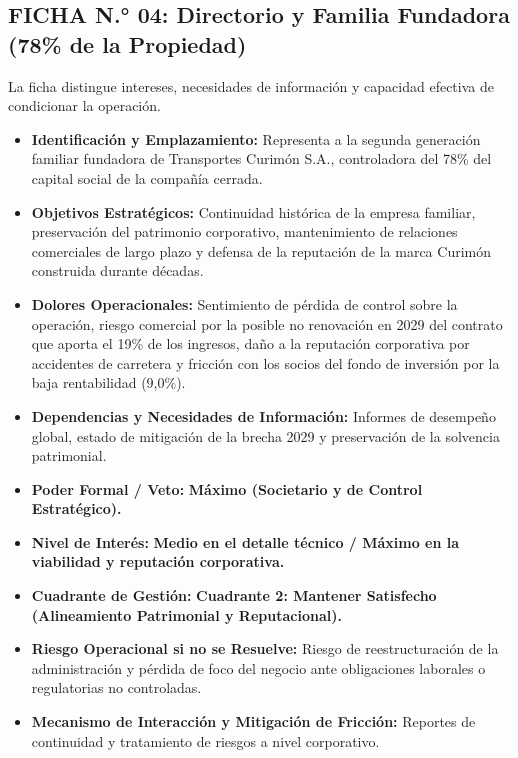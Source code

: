\subsection*{FICHA N.° 04: Directorio y Familia Fundadora (78\% de la Propiedad)}
La ficha distingue intereses, necesidades de información y capacidad efectiva de condicionar la operación.
\begin{itemize}
\item \textbf{Identificación y Emplazamiento:} Representa a la segunda generación familiar fundadora de Transportes Curimón S.A., controladora del 78\% del capital social de la compañía cerrada.
\item \textbf{Objetivos Estratégicos:} Continuidad histórica de la empresa familiar, preservación del patrimonio corporativo, mantenimiento de relaciones comerciales de largo plazo y defensa de la reputación de la marca Curimón construida durante décadas.
\item \textbf{Dolores Operacionales:} Sentimiento de pérdida de control sobre la operación, riesgo comercial por la posible no renovación en 2029 del contrato que aporta el 19\% de los ingresos, daño a la reputación corporativa por accidentes de carretera y fricción con los socios del fondo de inversión por la baja rentabilidad (9,0\%).
\item \textbf{Dependencias y Necesidades de Información:} Informes de desempeño global, estado de mitigación de la brecha 2029 y preservación de la solvencia patrimonial.
\item \textbf{Poder Formal / Veto:} \textbf{Máximo (Societario y de Control Estratégico).}
\item \textbf{Nivel de Interés:} \textbf{Medio en el detalle técnico / Máximo en la viabilidad y reputación corporativa.}
\item \textbf{Cuadrante de Gestión:} \textbf{Cuadrante 2: Mantener Satisfecho (Alineamiento Patrimonial y Reputacional).}
\item \textbf{Riesgo Operacional si no se Resuelve:} Riesgo de reestructuración de la administración y pérdida de foco del negocio ante obligaciones laborales o regulatorias no controladas.
\item \textbf{Mecanismo de Interacción y Mitigación de Fricción:} Reportes de continuidad y tratamiento de riesgos a nivel corporativo.
\end{itemize}
